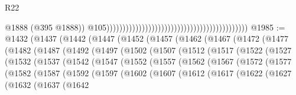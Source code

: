 \begin{lexlean}{R22}
\begin{coremodule}
                                                                                              @1888
                                                                                              (@395
                                                                                                @1888))
                                                                                            @105))))))))))))))))))))))))))))))))))))))))))))
@1985 := @1432
    (@1437
      (@1442
        (@1447
          (@1452
            (@1457
              (@1462
                (@1467
                  (@1472
                    (@1477
                      (@1482
                        (@1487
                          (@1492
                            (@1497
                              (@1502
                                (@1507
                                  (@1512
                                    (@1517
                                      (@1522
                                        (@1527
                                          (@1532
                                            (@1537
                                              (@1542
                                                (@1547
                                                  (@1552
                                                    (@1557
                                                      (@1562
                                                        (@1567
                                                          (@1572
                                                            (@1577
                                                              (@1582
                                                                (@1587
                                                                  (@1592
                                                                    (@1597
                                                                      (@1602
                                                                        (@1607
                                                                          (@1612
                                                                            (@1617
                                                                              (@1622
                                                                                (@1627
                                                                                  (@1632
                                                                                    (@1637
                                                                                      (@1642

\end{coremodule}
\end{lexlean}
